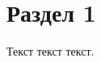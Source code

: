 \documentclass[a4paper,14pt,oneside,openany]{G7-32}
\begin{document}
\maketitle
\tableofcontents
\section{Раздел 1}
Текст текст текст.
\end{document}
